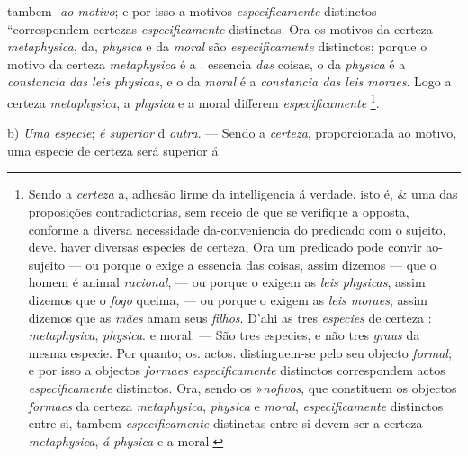 tambem- \emph{ao-motivo}; e-por isso-a-motivos \emph{especificamente} distinctos “correspondem certezas \emph{especificamente} distinctas. Ora os motivos da certeza \emph{metaphysica}, da, \emph{physica} e da \emph{moral} são \emph{especificamente} distinctos; porque o motivo da certeza \emph{metaphysica} é a . essencia \emph{das} coisas, o da \emph{physica} é a \emph{constancia das leis physicas}, e o da \emph{moral} é a \emph{constancia das leis moraes}. Logo a certeza \emph{metaphysica}, a \emph{physica} e a moral differem \emph{especificamente} \footnote{Sendo a \emph{certeza} a, adhesão lirme da intelligencia á verdade, isto é, \& uma das proposições contradictorias, sem receio de que se verifique a opposta, conforme a diversa necessidade da-conveniencia do predicado com o sujeito, deve. haver diversas especies de certeza, Ora um predicado pode convir ao-sujeito --- ou porque o exige a essencia das coisas, assim dizemos --- que o homem é animal \emph{racional}, --- ou porque o exigem as \emph{leis physicas}, assim dizemos que o \emph{fogo} queima, --- ou porque o exigem as \emph{leis moraes}, assim dizemos que as \emph{mães} amam seus \emph{filhos}. D'ahi as tres \emph{especies} de certeza : \emph{metaphysica}, \emph{physica}. e moral: --- São tres especies, e não tres \emph{graus} da mesma especie. Por quanto; os. actos. distinguem-se pelo seu objecto \emph{formal}; e por isso a objectos \emph{formaes especificamente} distinctos correspondem actos \emph{especificamente} distinctos. Ora, sendo os »\emph{nofivos}, que constituem os objectos \emph{formaes} da certeza \emph{metaphysica}, \emph{physica} e \emph{moral}, \emph{especificamente} distinctos entre si, tambem \emph{especificamente} distinctas entre si devem ser a certeza \emph{metaphysica}, \emph{á physica} e a moral.}.

b) \emph{Uma especie}; \emph{é superior} d \emph{outra}. --- Sendo a \emph{certeza}, proporcionada ao motivo, uma especie de certeza será superior á


